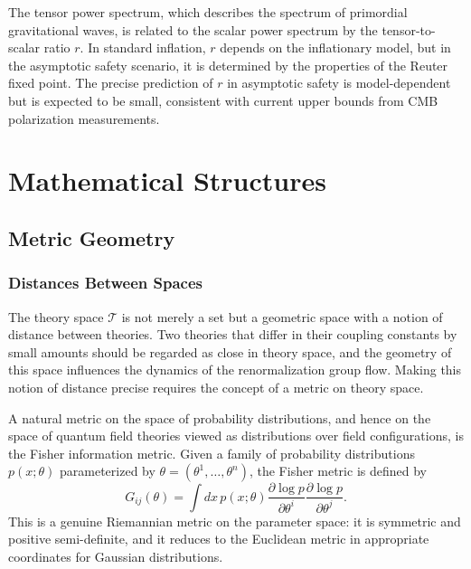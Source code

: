 \documentclass[11pt, twoside, openright]{book}
\theoremstyle{dotted}
\theoremstyle{definition}
\newcommand{\cT}{\mathcal{T}}          %
\begin{document}
The tensor power spectrum, which describes the spectrum of primordial gravitational
waves, is related to the scalar power spectrum by the tensor-to-scalar ratio $r$.
In standard inflation, $r$ depends on the inflationary model, but in the asymptotic
safety scenario, it is determined by the properties of the Reuter fixed point. The
precise prediction of $r$ in asymptotic safety is model-dependent but is expected
to be small, consistent with current upper bounds from CMB polarization measurements.

\part{Mathematical Structures}

\chapter{Metric Geometry}
\label{ch:metric_geometry}

\section{Distances Between Spaces}
\label{sec:distances_between_spaces}

The theory space $\cT$ is not merely a set but a geometric space with a notion of
distance between theories. Two theories that differ in their coupling constants by
small amounts should be regarded as close in theory space, and the geometry of this
space influences the dynamics of the renormalization group flow. Making this notion
of distance precise requires the concept of a metric on theory space.

A natural metric on the space of probability distributions, and hence on the space
of quantum field theories viewed as distributions over field configurations, is
the Fisher information metric. Given a family of probability distributions
$p(x; \theta)$ parameterized by $\theta = (\theta^1, \ldots, \theta^n)$, the
Fisher metric is defined by
\begin{equation}
  G_{ij}(\theta) = \int dx \, p(x;\theta) \frac{\partial\log p}{\partial\theta^i}
  \frac{\partial\log p}{\partial\theta^j}.
  \label{eq:fisher_metric}
\end{equation}
This is a genuine Riemannian metric on the parameter space: it is symmetric and
positive semi-definite, and it reduces to the Euclidean metric in appropriate
coordinates for Gaussian distributions.
\end{document}
